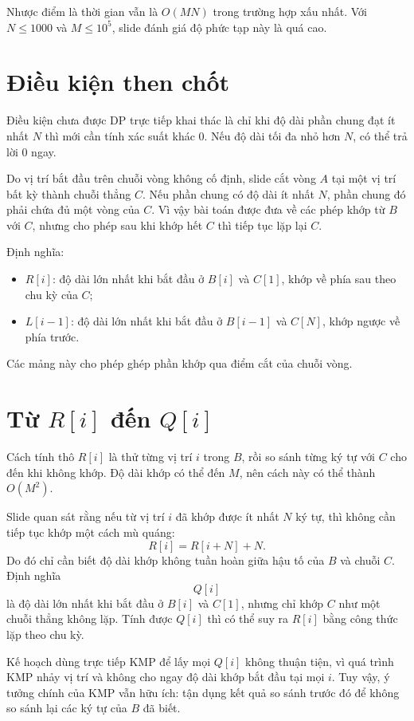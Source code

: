 \documentclass[11pt]{article}
\begin{document}
Nhược điểm là thời gian vẫn là \(O(MN)\) trong trường hợp xấu nhất. Với
\(N\le1000\) và \(M\le10^5\), slide đánh giá độ phức tạp này là quá cao.

\section{Điều kiện then chốt}

Điều kiện chưa được DP trực tiếp khai thác là chỉ khi độ dài phần chung đạt
ít nhất \(N\) thì mới cần tính xác suất khác \(0\). Nếu độ dài tối đa nhỏ hơn
\(N\), có thể trả lời \(0\) ngay.

Do vị trí bắt đầu trên chuỗi vòng không cố định, slide cắt vòng \(A\) tại một
vị trí bất kỳ thành chuỗi thẳng \(C\). Nếu phần chung có độ dài ít nhất
\(N\), phần chung đó phải chứa đủ một vòng của \(C\). Vì vậy bài toán được
đưa về các phép khớp từ \(B\) với \(C\), nhưng cho phép sau khi khớp hết
\(C\) thì tiếp tục lặp lại \(C\).

Định nghĩa:
\begin{itemize}
  \item \(R[i]\): độ dài lớn nhất khi bắt đầu ở \(B[i]\) và \(C[1]\), khớp
  về phía sau theo chu kỳ của \(C\);
  \item \(L[i-1]\): độ dài lớn nhất khi bắt đầu ở \(B[i-1]\) và \(C[N]\),
  khớp ngược về phía trước.
\end{itemize}
Các mảng này cho phép ghép phần khớp qua điểm cắt của chuỗi vòng.

\section{Từ \texorpdfstring{\(R[i]\)}{R[i]} đến \texorpdfstring{\(Q[i]\)}{Q[i]}}

Cách tính thô \(R[i]\) là thử từng vị trí \(i\) trong \(B\), rồi so sánh
từng ký tự với \(C\) cho đến khi không khớp. Độ dài khớp có thể đến \(M\),
nên cách này có thể thành \(O(M^2)\).

Slide quan sát rằng nếu từ vị trí \(i\) đã khớp được ít nhất \(N\) ký tự, thì
không cần tiếp tục khớp một cách mù quáng:
\[
  R[i]=R[i+N]+N.
\]
Do đó chỉ cần biết độ dài khớp không tuần hoàn giữa hậu tố của \(B\) và
chuỗi \(C\). Định nghĩa
\[
  Q[i]
\]
là độ dài lớn nhất khi bắt đầu ở \(B[i]\) và \(C[1]\), nhưng chỉ khớp
\(C\) như một chuỗi thẳng không lặp. Tính được \(Q[i]\) thì có thể suy ra
\(R[i]\) bằng công thức lặp theo chu kỳ.

Kế hoạch dùng trực tiếp KMP để lấy mọi \(Q[i]\) không thuận tiện, vì quá
trình KMP nhảy vị trí và không cho ngay độ dài khớp bắt đầu tại mọi \(i\).
Tuy vậy, ý tưởng chính của KMP vẫn hữu ích: tận dụng kết quả so sánh trước
đó để không so sánh lại các ký tự của \(B\) đã biết.
\end{document}
